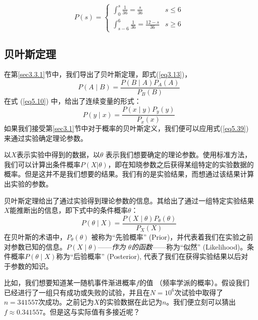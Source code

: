 \documentclass[UTF8]{ctexart}
\numberwithin{equation}{section}%
\numberwithin{figure}{section}%
\begin{document}
    \begin{equation}
    P(s)= \begin{cases}\int_{0}^{s} \frac{1}{36}=\frac{s}{36} & s \leq 6 \\ \int_{s-6}^{6} \frac{1}{36}=\frac{12-s}{36} & s \geq 6\end{cases}
    \end{equation}

    \subsection{贝叶斯定理}\label{sec5.5}
    
    在第\ref{sec3.3.1}节中，我们导出了贝叶斯定理，即式(\ref{eq3.13})，
    \begin{equation}\label{eq5.39}
    P(A \mid B)=\frac{P(B \mid A) P_{A}(A)}{P_{B}(B)}
    \end{equation}
    在式 (\ref{eq5.10}) 中，给出了连续变量的形式：
    \begin{equation}
        P(y \mid x)=\frac{P(x \mid y) P_{y}(y)}{P_{x}(x)} 
    \end{equation}
    如果我们接受第\ref{sec3.1}节中对于概率的贝叶斯定义，我们便可以应用式(\ref{eq5.39})来通过实验确定理论参数。
    
    以$X$表示实验中得到的数据，以$\theta$ 表示我们想要确定的理论参数。使用标准方法，我们可以计算出条件概率$P(X|\theta)$，即在知晓参数之后获得某组特定的实验数据的概率。但是这并不是我们想要的结果。我们有的是实验结果，而想通过该结果计算出实验的参数。
    
    贝叶斯定理给出了通过实验得到理论参数的信息。其给出了通过一组特定实验结果$X$能推断出的信息，即下式中的条件概率$\theta$：
    \begin{equation}\label{eq5.41}
        P(\theta \mid X)=\frac{P(X \mid \theta) P_{\theta}(\theta)}{P_{X}(X)}        
    \end{equation}
    在贝叶斯的术语中，$P_{\theta}(\theta)$ 被称为“先验概率” (Prior)，并代表着我们在实验之前对参数已知的信息。$P(X \mid \theta)$——\textit{作为 $\theta$的函数}——称为“似然” (Likelihood)。条件概率$P(\theta \mid X)$称为“后验概率” (Posterior), 代表了我们在获得实验结果以后对于参数的知识。
    
    比如，我们想要知道某一随机事件渐进概率$f$的值 （频率学派的概率）。假设我们已经进行了一组只有成功或失败的试验，并且在$N=10^{6}$次试验中取得了$n=341557$次成功。之前记为$X$的实验数据在此记为$n$。我们便立刻可以猜出$f \approx 0.341557$。但是这与实际值有多接近呢？
    
\end{document}
